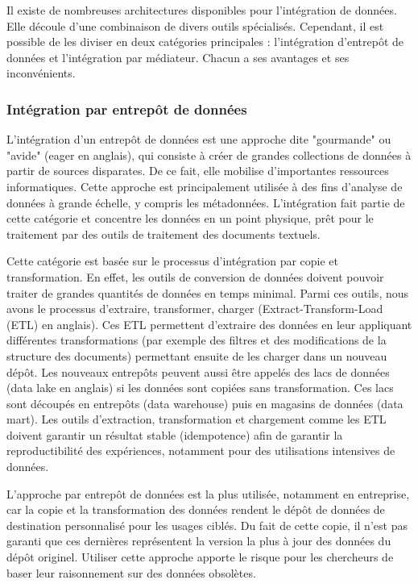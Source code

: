 \documentclass{article}
\begin{document}
	Il existe de nombreuses architectures disponibles pour l’intégration de données. Elle découle d’une combinaison de divers outils spécialisés. Cependant, il est possible de les diviser en deux catégories principales : l’intégration d’entrepôt de données et l’intégration par médiateur. Chacun a ses avantages et ses inconvénients.
	
	\subsubsection{Intégration par entrepôt de données}
	L’intégration d’un entrepôt de données est une approche dite "gourmande" ou "avide" (eager en anglais), qui consiste à créer de grandes collections de données à partir de sources disparates. De ce fait, elle mobilise d’importantes ressources informatiques. Cette approche est principalement utilisée à des fins d’analyse de données à grande échelle, y compris les métadonnées. L’intégration fait partie de cette catégorie et concentre les données en un point physique, prêt pour le traitement par des outils de traitement des documents textuels.
	
	Cette catégorie est basée sur le processus d’intégration par copie et transformation. En effet, les outils de conversion de données doivent pouvoir traiter de grandes quantités de données en temps minimal. Parmi ces outils, nous avons le processus d’extraire, transformer, charger (Extract-Transform-Load (ETL) en anglais). Ces ETL permettent d’extraire des données en leur appliquant différentes transformations (par exemple des filtres et des modifications de la structure des documents) permettant ensuite de les charger dans un nouveau dépôt. Les nouveaux entrepôts peuvent aussi être appelés des lacs de données (data lake en anglais) si les données sont copiées sans transformation. Ces lacs sont découpés en entrepôts (data warehouse) puis en magasins de données (data mart). Les outils d’extraction, transformation et chargement comme les ETL doivent garantir un résultat stable (idempotence) afin de garantir la reproductibilité des expériences, notamment pour des utilisations intensives de données.
	
	
	
	L’approche par entrepôt de données est la plus utilisée, notamment en entreprise, car la copie et la transformation des données rendent le dépôt de données de destination personnalisé pour les usages ciblés. Du fait de cette copie, il n’est pas garanti que ces dernières représentent la version la plus à jour des données du dépôt originel. Utiliser cette approche apporte le risque pour les chercheurs de baser leur raisonnement sur des données obsolètes.
	
\end{document}
